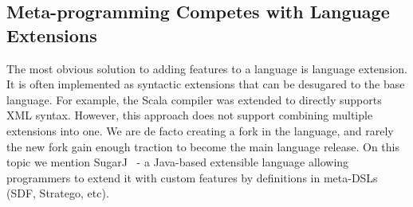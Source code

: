 \begin{comment}
\subsection{Type-Directed Translations/Syntactic Sugar}
\marco{I'm tring to merge this and the next one}
Language extensions are often implemented as syntactic sugar of the base
language. For example, Scala compiler supports XML syntax in normal Scala code
directly (after Scala ?, users need to import \texttt{scala-xml} library
manually). However, this approach is hard in terms of implementation, because it
requires extending the compiler. Also, this approach does not support combining
multiple extensions into one.

SugarJ~\cite{erdweg11sugarj} is a Java-based extensible programming language
that allows programmers to extend the base language with custom language
features by definitions in meta-DSLs (SDF, Stratego, etc). 
\yanlin{Is new syntax really a ``drawback''? I think for some system, like
  SugarJ, one of purpose IS to introduce these new syntax.}  Drawbacks: new
syntax. To create the extension, programmers have to work with multiple
languages (SDF, stratego, etc) while our approach works totally in Java
environment.

We can model certain types of language extensions with annotations 
only, but those extensions do not introduce new syntax: they 
merely do automatic code generation. 
\end{comment}

\subsection{Meta-programming Competes with Language Extensions}
The most obvious solution to adding features to a language is language
extension.  It is often implemented as syntactic extensions that can be
desugared to the base language. For example, the Scala compiler was extended to
directly supports XML syntax. However, this approach does not support combining
multiple extensions into one. We are de facto creating a fork in the language,
and rarely the new fork gain enough traction to become the main language
release.  On this topic we mention SugarJ~\cite{erdweg11sugarj} - a Java-based
extensible language allowing programmers to extend it with custom features by
definitions in meta-DSLs (SDF, Stratego, etc).

